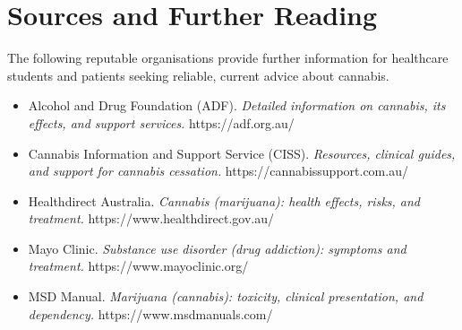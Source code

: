 \section*{Sources and Further Reading}
The following reputable organisations provide further information for healthcare students and patients seeking reliable, current advice about cannabis.

\begin{itemize}
    \item Alcohol and Drug Foundation (ADF). \textit{Detailed information on cannabis, its effects, and support services.} https://adf.org.au/
    \item Cannabis Information and Support Service (CISS). \textit{Resources, clinical guides, and support for cannabis cessation.} https://cannabissupport.com.au/
    \item Healthdirect Australia. \textit{Cannabis (marijuana): health effects, risks, and treatment.} https://www.healthdirect.gov.au/
    \item Mayo Clinic. \textit{Substance use disorder (drug addiction): symptoms and treatment.} https://www.mayoclinic.org/
    \item MSD Manual. \textit{Marijuana (cannabis): toxicity, clinical presentation, and dependency.} https://www.msdmanuals.com/
\end{itemize}
